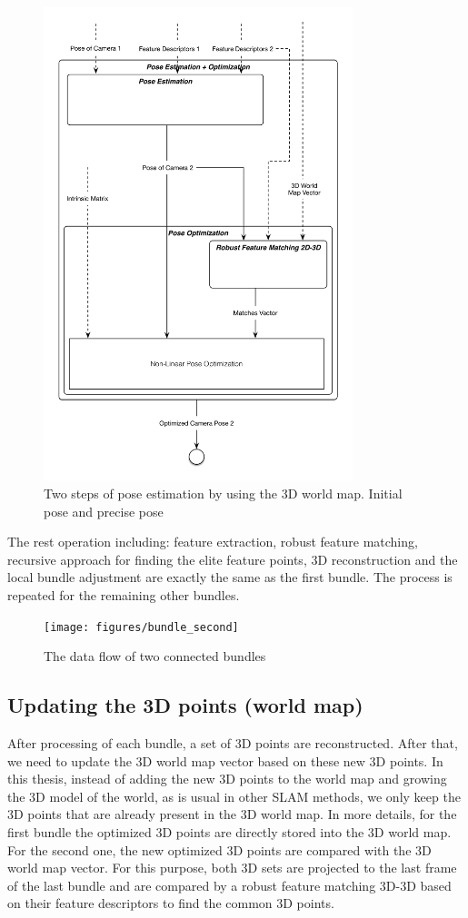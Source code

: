 \begin{figure}[H]
  \centering
  \includegraphics[width=90mm]{figures/pose_estimation_optimization}
  \caption{Two steps of pose estimation by using the 3D world map. Initial pose and precise pose}\label{fig:pose_estimation_optimization}
\end{figure}

The rest operation including: feature extraction, robust feature matching, recursive approach for finding the elite feature points, 3D reconstruction and the local bundle adjustment are exactly the same as the first bundle. The process is repeated for the remaining other bundles. 

\begin{figure}[H]
  \centering
  \texttt{[image: figures/bundle\_second]}
  \caption{The data flow of two connected bundles}\label{fig:bundle_second}
\end{figure}

\subsection{Updating the 3D points (world map)} \label{subsec:update_3d_points}
After processing of each bundle, a set of 3D points are reconstructed. After that, we need to update the 3D world map vector based on these new 3D points. In this thesis, instead of adding the new 3D points to the world map and growing the 3D model of the world, as is usual in other SLAM methods, we only keep the 3D points that are already present in the 3D world map. In more details, for the first bundle the optimized 3D points are directly stored into the 3D world map. For the second one, the new optimized 3D points are compared with the 3D world map vector. For this purpose, both 3D sets are projected to the last frame of the last bundle and are compared by a robust feature matching 3D-3D based on their feature descriptors to find the common 3D points. 

